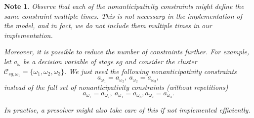 \documentclass{article}
\newtheorem{note}{Note}[section]
\begin{document}
\begin{note}
Observe that each of the nonanticipativity constraints  might define the same constraint multiple times. This is not necessary in the implementation of the model, and in fact, we do not include them multiple times in our implementation.
	
Moreover, it is possible to reduce the number of constraints further. For example, let $a_{\omega}$ be a decision variable of stage $sg$ and consider the cluster $\mathcal{C}_{sg, \omega_1} = \{ \omega_1, \omega_2, \omega_3 \}$. We just need the following nonanticipativity constraints 
$$
a_{\omega_1} = a_{\omega_2}, \ a_{\omega_2} = a_{\omega_3},
$$
instead of the full set of nonanticipativity constraints (without repetitions)
$$
a_{\omega_1} = a_{\omega_2}, \ a_{\omega_1} = a_{\omega_3}, a_{\omega_2} = a_{\omega_3}.
$$

In practise, a presolver might also take care of this if not implemented efficiently.	
\end{note}
\end{document}
